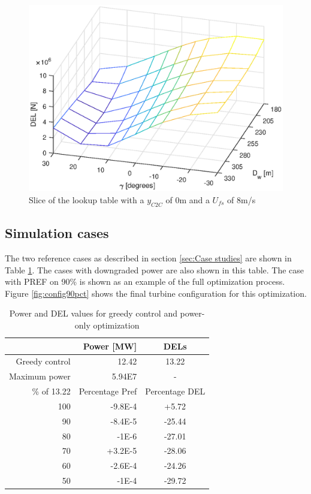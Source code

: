 \begin{figure}
	\includegraphics[width=\linewidth]{./Figures/LUTslice_yWake0_Ufs8.eps}
	\caption{Slice of the lookup table with a $y_{C2C}$ of 0m and a $U_{fs}$ of 8m/s }
	\label{fig:LUTsliceDw}
\end{figure}

\subsection{Simulation cases}
\label{sec:Simulation cases}
The two reference cases as described in section \ref{sec:Case studies} are shown in Table \ref{tab:Case results}. The cases with downgraded power are also shown in this table. The case with PREF on 90\% is shown as an example of the full optimization process. Figure \ref{fig:config90pct} shows the final turbine configuration for this optimization. 

\begin{table}[p]
	\caption{Power and DEL values for greedy control and power-only optimization}
	\centering
	\label{tab:Case results}
	\begin{tabular}{rrc}
		\hline
		& Power [MW] & DELs \\ 
		\hline
		Greedy control & 12.42 & 13.22 \\
		Maximum power & 5.94E7 & - \\
		\hline
		\% of 13.22 & Percentage Pref & Percentage DEL\\
		\hline
		100 & -9.8E-4 & +5.72 \\
		90 & -8.4E-5 & -25.44 \\ %
		80 & -1E-6 & -27.01 \\ %
		70 & +3.2E-5 & -28.06 \\ %
		60 & -2.6E-4 & -24.26 \\ %
		50 & -1E-4 & -29.72 \\ %
	\end{tabular}
\end{table}

